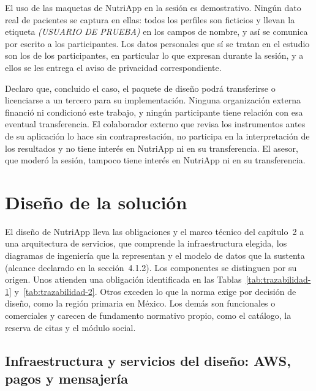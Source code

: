 \documentclass[12pt, a4paper]{article}
\makeatletter
\newcommand{\saltoseccion}{\par
  \ifx\@deferlist\@empty
    \ifdim\pagegoal<\maxdimen
      \ifdim\dimexpr\textheight-\pagegoal+\pagetotal\relax>0.5\textheight\clearpage\fi
    \fi
  \else\clearpage\fi}
\let\seccionbase\section
\renewcommand{\section}{\saltoseccion\seccionbase}
\makeatother
\begin{document}
El uso de las maquetas de NutriApp en la sesión es demostrativo.
Ningún dato real de pacientes se captura en ellas: todos los perfiles
son ficticios y llevan la etiqueta \textit{(USUARIO DE PRUEBA)} en los
campos de nombre, y así se comunica por escrito a los participantes.
Los datos personales que sí se tratan en el estudio son los de los
participantes, en particular lo que expresan durante la sesión, y a ellos se les
entrega el aviso de privacidad correspondiente.
 
Declaro que, concluido el caso, el paquete de diseño podrá
transferirse o licenciarse a un tercero para su implementación.
Ninguna organización externa financió ni condicionó este trabajo, y
ningún participante tiene relación con esa eventual transferencia. El
colaborador externo que revisa los instrumentos antes de su aplicación lo hace
sin contraprestación, no participa en la interpretación de los
resultados y no tiene interés en NutriApp ni en su transferencia. El asesor, que moderó la sesión, tampoco tiene interés en
NutriApp ni en su transferencia.

\section{Diseño de la solución}
 
El diseño de NutriApp lleva las obligaciones y el marco técnico del
capítulo~2 a una arquitectura de servicios, que comprende la
infraestructura elegida, los diagramas de ingeniería que la
representan y el modelo de datos que la sustenta (alcance declarado
en la sección~4.1.2). Los componentes se distinguen por su origen.
Unos atienden una obligación identificada en las
Tablas~\ref{tab:trazabilidad-1} y~\ref{tab:trazabilidad-2}. Otros
exceden lo que la norma exige por decisión de diseño, como la región
primaria en México. Los demás son funcionales o comerciales y carecen
de fundamento normativo propio, como el catálogo, la reserva de citas
y el módulo social.
 
 
\subsection{Infraestructura y servicios del diseño: AWS, pagos y mensajería}
\end{document}
